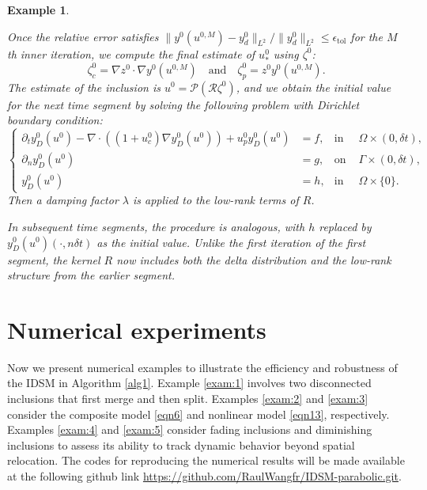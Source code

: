 \documentclass[onefignum,onetabnum]{siamart190516}
\newtheorem{example}{Example}[section]
\numberwithin{equation}{section}
\begin{document}
\begin{example}
\begin{itemize}
Once the relative error satisfies ${\|y^0(u^{0,M}) - y_{d}^0\|_{L^2}}/{\|y_{d}^0\|_{L^2}} \leq \epsilon_{\text{tol}}$ for {the $M$th inner iteration}, we compute the final estimate of $u_*^0$ using $\zeta^0$:
\begin{equation*}
\zeta_c^0 = \nabla z^0 \cdot \nabla y^0(u^{0,M})\quad\text{and}\quad
\zeta_p^0 = z^0 y^0(u^{0,M}).
\end{equation*}
The estimate of the inclusion is $u^0 = \mathcal{P}(\mathcal{R} \zeta^0)$, and we obtain the initial value for the next time segment by solving the following problem with Dirichlet boundary condition:
\begin{equation*}
\left\{
\begin{aligned}
\partial_{t} y_{D}^{0}(u^{0}) - \nabla \cdot \left((1 + u_{c}^{0}) \nabla y_{D}^{0}(u^{0})\right) + u_{p}^{0} y_{D}^{0}(u^{0}) &= f, & \text{in }& \Omega \times (0, \delta t), \\
{\partial_n} y_{D}^{0}(u^{0}) &= g, & \text{on }& \Gamma \times (0, \delta t), \\
y_{D}^{0}(u^{0}) &= h, & \text{in }& \Omega \times \{0\}.
\end{aligned}
\right.
\end{equation*}
Then a damping factor $\lambda$ is applied to the low-rank terms of $R$.
\end{itemize}

In subsequent time segments, the procedure is analogous, with $h$ replaced by $y_{D}^0(u^0)(\cdot, n\delta t)$ as the initial value.
Unlike the first iteration of the first segment, the kernel $R$ now includes both the delta distribution and the low-rank structure from the earlier segment.
\end{example}

\section{Numerical experiments} \label{sec:NUM}
\newcommand{\figlen}{0.16\textwidth}

Now we present numerical examples to illustrate the efficiency and robustness of the IDSM in Algorithm \ref{alg1}.
Example \ref{exam:1} involves two disconnected inclusions that first merge and then split.
Examples \ref{exam:2} and \ref{exam:3} consider the composite model \eqref{eqn6} and nonlinear model \eqref{eqn13}, respectively.
Examples \ref{exam:4} and \ref{exam:5} consider fading inclusions and diminishing inclusions to assess its ability to track dynamic behavior beyond spatial relocation.
The codes for reproducing the numerical results will be made available at the following github link \url{https://github.com/RaulWangfr/IDSM-parabolic.git}.
\end{document}
